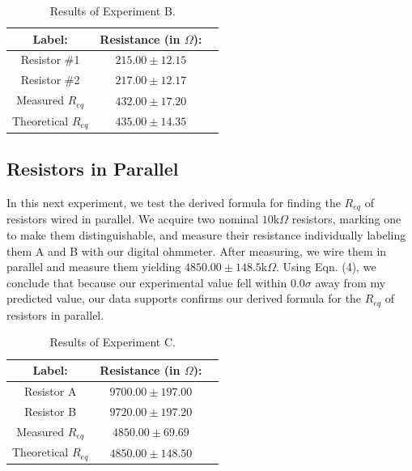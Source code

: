 \documentclass[aps,reprint,floatfix]{revtex4-1}
\newcommand{\forceindent}{\leavevmode{\parindent=1em\indent}}
\begin{document}
\begin{table}[h]
	\begin{tabular}{|c||c|c|}
		\hline		
		Label: 				& Resistance (in $\Omega$):\\ 
		\hline
		\hline
		Resistor \#1			& $215.00 \pm 12.15$ \\ \hline
		Resistor \#2			& $217.00 \pm 12.17$ \\ \hline
		Measured $R_{eq}$		& $432.00 \pm 17.20$ \\ \hline
		Theoretical $R_{eq}$	& $435.00 \pm 14.35$ \\
		\hline
	\end{tabular}
\caption{Results of Experiment B.}
\end{table}

\subsection{Resistors in Parallel}
\forceindent In this next experiment, we test the derived formula for finding the $R_{eq}$ of resistors wired in parallel. We acquire two nominal $10$k$\Omega$ resistors, marking one to make them distinguishable, and measure their resistance individually labeling them A and B with our digital ohmmeter. After measuring, we wire them in parallel and measure them yielding $4850.00 \pm 148.5$k$\Omega$. Using Eqn. (4), we conclude that because our experimental value fell within $0.0 \sigma$ away from my predicted value, our data supports confirms our derived formula for the $R_{eq}$ of resistors in parallel.

\begin{table}[h]
	\begin{tabular}{|c||c|c|}
		\hline		
		Label: 				& Resistance (in $\Omega$):\\ 
		\hline
		\hline
		Resistor A				& $9700.00 \pm 197.00$ \\ \hline
		Resistor B				& $9720.00 \pm 197.20$ \\ \hline
		Measured $R_{eq}$		& $4850.00 \pm 69.69$ \\ \hline
		Theoretical $R_{eq}$	& $4850.00 \pm 148.50$ \\
		\hline
	\end{tabular}
\caption{Results of Experiment C.}
\end{table}
\end{document}

